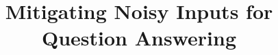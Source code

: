 \documentclass[a4paper]{article}
\title{Mitigating Noisy Inputs for Question Answering}
\date{}
\newcommand{\latexfile}[1]{}
\begin{document}
\newcommand{\asr}{\textsc{asr}}
\newcommand{\dan}{\textsc{dan}}
\newcommand{\rnn}{\textsc{rnn}}
\newcommand{\unk}{<\textit{unk}>}


\maketitle

\latexfile{00-abstract}
\latexfile{10-intro}
\latexfile{20-data}
\latexfile{30-models}
\latexfile{40-results}
\latexfile{45-discussion}
\latexfile{47-related}
\latexfile{50-conclusion}
\latexfile{60-acknowledgment}




\clearpage

\latexfile{appendix}
\end{document}
